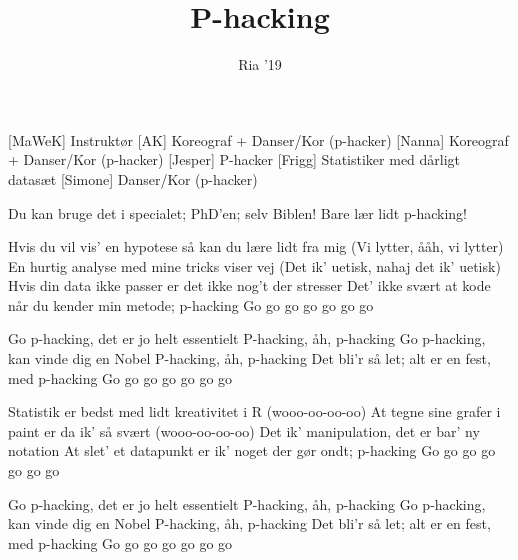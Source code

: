 \documentclass[a4paper,11pt]{article}
\title{P-hacking}
\author{Ria '19}
\begin{document}
\maketitle

\begin{roles}
[MaWeK] Instruktør
[AK] Koreograf + Danser/Kor (p-hacker)
[Nanna] Koreograf + Danser/Kor (p-hacker)
[Jesper] P-hacker
[Frigg] Statistiker med dårligt datasæt
[Simone] Danser/Kor (p-hacker)
\end{roles}

\begin{props}
\end{props}


\begin{song}

 Du kan bruge det i specialet; PhD'en; selv Biblen!
Bare lær lidt p-hacking!

 Hvis du vil vis' en hypotese så kan du lære lidt fra mig
 (Vi lytter, ååh, vi lytter)
 En hurtig analyse med mine tricks viser vej
 (Det ik' uetisk, nahaj det ik' uetisk)
 Hvis din data ikke passer er det ikke nog't der stresser
Det' ikke svært at kode når du kender min metode; p-hacking
 Go go go go go go go

 Go p-hacking, det er jo helt essentielt
 P-hacking, åh, p-hacking
 Go p-hacking, kan vinde dig en Nobel
 P-hacking, åh, p-hacking
 Det bli'r så let; alt er en fest, med p-hacking
 Go go go go go go go

 Statistik er bedst med lidt kreativitet i R
 (wooo-oo-oo-oo)
 At tegne sine grafer i paint er da ik' så svært
 (wooo-oo-oo-oo)
 Det ik' manipulation, det er bar' ny notation
At slet' et datapunkt er ik' noget der gør ondt; p-hacking
 Go go go go go go go

 Go p-hacking, det er jo helt essentielt
 P-hacking, åh, p-hacking
 Go p-hacking, kan vinde dig en Nobel
 P-hacking, åh, p-hacking
 Det bli'r så let; alt er en fest, med p-hacking
 Go go go go go go go


\end{song}
\end{document}
